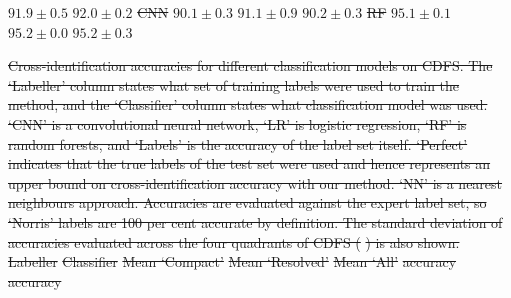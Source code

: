 \documentclass[11pt, a4paper]{book}
\providecommand{\DIFdeltex}[1]{{\protect\color{red}\sout{#1}}}                      %
\providecommand{\DIFdelFL}[1]{\DIFdel{#1}} %
\providecommand{\DIFdel}[1]{\texorpdfstring{\DIFdeltex{#1}}{}} %
\begin{document}
\DIFdelFL{$91.9 \pm 0.5$ }%
\DIFdelFL{$92.0 \pm 0.2$}%
\DIFdelFL{CNN }%
\DIFdelFL{$90.1 \pm 0.3$ }%
\DIFdelFL{$91.1 \pm 0.9$ }%
\DIFdelFL{$90.2 \pm 0.3$}%
\DIFdelFL{RF }%
\DIFdelFL{$95.1 \pm 0.1$ }%
\DIFdelFL{$95.2 \pm 0.0$ }%
\DIFdelFL{$95.2 \pm 0.3$}%

{%
\DIFdelFL{Cross-identification accuracies for different classification
    models on CDFS. The `Labeller' column states what set of training labels
    were used to train the method, and the `Classifier' column states what
    classification model was used. `CNN' is a convolutional neural network,
    `LR' is logistic regression, `RF' is random forests, and `Labels' is the
    accuracy of the label set itself. `Perfect' indicates that the true labels
    of the test set were used and hence represents an upper bound on
    cross-identification accuracy with our method. `NN' is a
    nearest neighbours approach. Accuracies are evaluated against the expert
    label set, so `Norris' labels are 100 per cent accurate by definition. The
    standard deviation of accuracies evaluated across the four quadrants of
    CDFS (}%
\DIFdelFL{) is also shown.}}
\DIFdelFL{Labeller }%
\DIFdelFL{Classifier }%
\DIFdelFL{Mean `Compact' }%
\DIFdelFL{Mean `Resolved' }%
\DIFdelFL{Mean `All'}%
\DIFdelFL{accuracy }%
\DIFdelFL{accuracy }%
\end{document}
